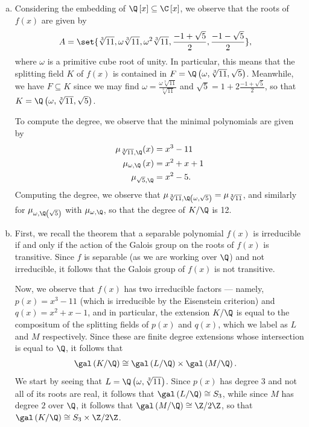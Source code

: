 \documentclass[10pt]{mypackage}
\begin{document}
\begin{solution}\hfill
  \begin{enumerate}[(a)]
    \item Considering the embedding of $\Q\left[ x \right]\subseteq \C\left[ x \right]$, we observe that the roots of $f(x)$ are given by
      \begin{align*}
        A &= \set{\sqrt[3]{11},\omega\sqrt[3]{11},\omega^2\sqrt[3]{11},\frac{-1+\sqrt{5}}{2},\frac{-1-\sqrt{5}}{2}},
      \end{align*}
      where $\omega$ is a primitive cube root of unity. In particular, this means that the splitting field $K$ of $f(x)$ is contained in $F = \Q\left( \omega,\sqrt[3]{11},\sqrt{5} \right)$. Meanwhile, we have $F\subseteq K$ since we may find $\omega = \frac{\omega\sqrt[3]{11}}{\sqrt[3]{11}}$ and $\sqrt{5} = 1 + 2\frac{-1 + \sqrt{5}}{2}$, so that $K = \Q\left( \omega,\sqrt[3]{11},\sqrt{5} \right)$.

      To compute the degree, we observe that the minimal polynomials are given by
      \begin{align*}
        \mu_{\sqrt[3]{11},\Q}(x) &= x^3 - 11\\
        \mu_{\omega,\Q}\left( x \right) &= x^2 + x + 1\\
        \mu_{\sqrt{5},\Q} &= x^2 - 5.
      \end{align*}
      Computing the degree, we observe that $\mu_{\sqrt[3]{11},\Q\left( \omega,\sqrt{5} \right)} = \mu_{\sqrt[3]{11}}$, and similarly for $\mu_{\omega,\Q\left( \sqrt{5} \right)}$ with $\mu_{\omega,\Q}$, so that the degree of $K/\Q$ is 12.
    \item First, we recall the theorem that a separable polynomial $f(x)$ is irreducible if and only if the action of the Galois group on the roots of $f(x)$ is transitive. Since $f$ is separable (as we are working over $\Q$) and not irreducible, it follows that the Galois group of $f(x)$ is not transitive.

      Now, we observe that $f(x)$ has two irreducible factors --- namely, $p(x) = x^3-11$ (which is irreducible by the Eisenstein criterion) and $q(x) = x^2 + x - 1$, and in particular, the extension $K/\Q$ is equal to the compositum of the splitting fields of $p(x)$ and $q(x)$, which we label as $L$ and $M$ respectively. Since these are finite degree extensions whose intersection is equal to $\Q$, it follows that
      \begin{align*}
        \gal\left( K/\Q \right) &\cong \gal\left( L/\Q \right)\times \gal\left( M/\Q \right).
      \end{align*}
      We start by seeing that $L = \Q\left( \omega,\sqrt[3]{11} \right)$. Since $p(x)$ has degree $3$ and not all of its roots are real, it follows that $\gal\left( L/\Q \right)\cong S_3$, while since $M$ has degree $2$ over $\Q$, it follows that $\gal\left( M/\Q \right)\cong \Z/2\Z$, so that $\gal\left( K/\Q \right)\cong S_3\times \Z/2\Z$.
  \end{enumerate}
\end{solution}
\end{document}
